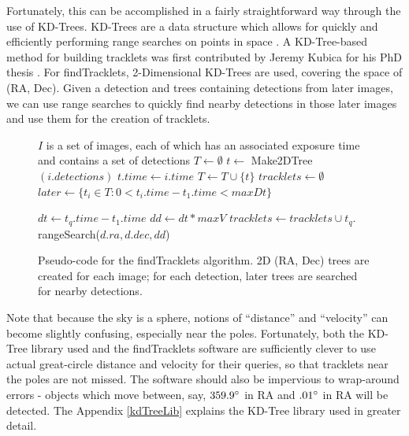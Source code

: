Fortunately, this can be
accomplished in a fairly straightforward way through the use of
KD-Trees.  KD-Trees are a data structure which allows for quickly and
efficiently performing range searches on points in space
\citep{bentley_kdtrees}.  A KD-Tree-based method for building
tracklets was first contributed by Jeremy Kubica for his PhD thesis
\citep{kubica_thesis}.  For findTracklets, 2-Dimensional KD-Trees are
used, covering the space of (RA, Dec).  Given a detection and trees
containing detections from later images, we can use range searches to
quickly find nearby detections in those later images and use them for
the creation of tracklets.

\begin{figure}[ht]
\begin{algorithmic}
\REQUIRE $I$ is a set of images, each of which has an associated exposure time and contains a set of detections
\STATE {}
\STATE $T \gets \emptyset$
  \STATE $t \gets$ Make2DTree$(i.detections)$
  \STATE $t.time \gets i.time$
  \STATE $T \gets T \cup \{t\}$
\ENDFOR
\STATE {}
\STATE $tracklets \gets \emptyset$
  \STATE $later \gets \{t_i \in T : 0 < t_i.time - t_1.time < maxDt\}$
 
       \STATE {}

        \STATE $dt \gets t_q.time - t_1.time$
        \STATE $dd \gets dt * maxV$
        \STATE {}
        \STATE $tracklets \gets tracklets \cup t_q.$rangeSearch($d.ra, d.dec, dd$)
     \ENDFOR
   \ENDFOR
\ENDFOR
{}
\end{algorithmic}

\caption{Pseudo-code for the findTracklets algorithm.  2D (RA, Dec)
  trees are created for each image; for each detection, later trees
  are searched for nearby detections. }
 \label{findTrackletsAlgorithm}
\end{figure}


Note that because the sky is a sphere, notions of ``distance'' and
``velocity'' can become slightly confusing, especially near the poles.
Fortunately, both the KD-Tree library used and the findTracklets
software are sufficiently clever to use actual great-circle distance
and velocity for their queries, so that tracklets near the poles are
not missed.  The software should also be impervious to wrap-around
errors - objects which move between, say, $359.9 \degree$ in RA and
$.01 \degree$ in RA will be detected.  The Appendix \ref{kdTreeLib}
explains the KD-Tree library used in greater detail.  







